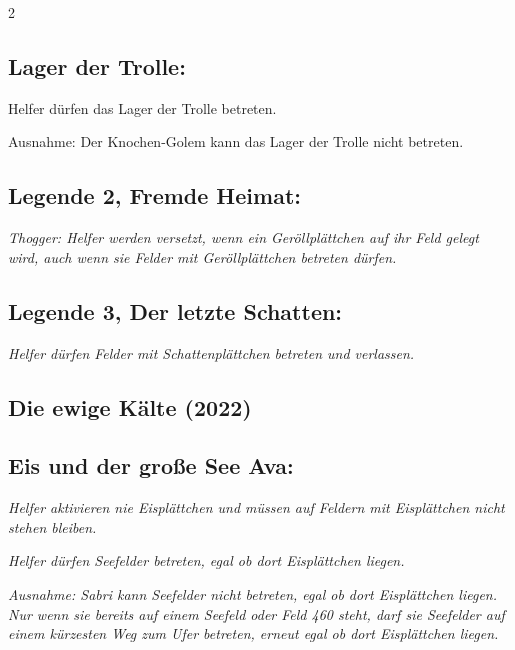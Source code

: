\documentclass[10pt, a4paper, oneside]{book}
\newcommand{\fan}[1]{\textit{#1}}
\begin{document}
\begin{multicols*}{2}
\begin{bgcolor}[color-DZ]
\subsection{Lager der Trolle:}

Helfer dürfen das Lager der Trolle betreten.
\supercite{DZ:Begleitheft,MH:Begleitheft,130389}

Ausnahme: Der Knochen-Golem kann das Lager der Trolle nicht betreten.
\supercite{DZ:Begleitheft}





\subsection{Legende 2, Fremde Heimat:}

\fan{Thogger: Helfer werden versetzt, wenn ein Geröllplättchen auf ihr Feld gelegt wird, auch wenn sie Felder mit Geröllplättchen betreten dürfen.}



\subsection{Legende 3, Der letzte Schatten:}

\fan{Helfer dürfen Felder mit Schattenplättchen betreten und verlassen.}

\end{bgcolor}








\begin{bgcolor}
\section{Die ewige Kälte (2022)}

\subsection{Eis und der große See Ava:}

\fan{Helfer aktivieren nie Eisplättchen und müssen auf Feldern mit Eisplättchen nicht stehen bleiben.}

\fan{Helfer dürfen Seefelder betreten, egal ob dort Eisplättchen liegen.}

\fan{Ausnahme: Sabri kann Seefelder nicht betreten, egal ob dort Eisplättchen liegen. Nur wenn sie bereits auf einem Seefeld oder Feld 460 steht, darf sie Seefelder auf einem kürzesten Weg zum Ufer betreten, erneut egal ob dort Eisplättchen liegen.}



\end{bgcolor}
\end{multicols*}
\end{document}
